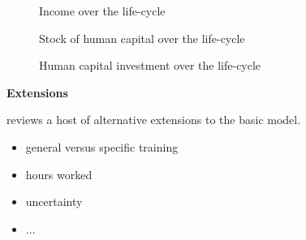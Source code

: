 \begin{frame}\begin{figure}[htp]\centering
\caption{Income over the life-cycle}\label{Income over the life-cycle}
\end{figure}\end{frame}

\begin{frame}\begin{figure}[htp]\centering
\caption{Stock of human capital over the life-cycle}
\label{Stock of human capital over the life-cycle}
\end{figure}\end{frame}

\begin{frame}\begin{figure}[htp]\centering
\caption{Human capital investment over the life-cycle}
\label{Human capital investment over the life-cycle}
\end{figure}\end{frame}
\begin{frame}\textbf{Extensions}\vspace{0.3cm}

 reviews a host of alternative extensions to the basic model.\\

\begin{itemize}\setlength\itemsep{1em}
\item general versus specific training
\item hours worked
\item uncertainty
\item $\hdots$
\end{itemize}

\end{frame}

